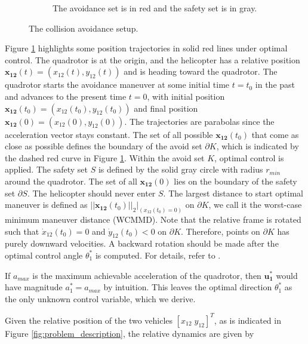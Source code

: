 \documentclass[journal,11pt,onecolumn,draftclsnofoot,]{IEEEtran}
\begin{document}
\begin{figure}
\begin{subfigure}[b]{.45\columnwidth}
        \caption{The avoidance set is in red and the safety set is in gray.}
        \label{fig:safety_set}
    \end{subfigure}
    \caption{The collision avoidance setup.}
    \label{fig:avoidance_setup}
\end{figure}


Figure \ref{fig:safety_set} highlights some position trajectories in solid red lines under optimal control. The quadrotor is at the origin, and the helicopter has a relative position $\boldsymbol{x_{12}}(t)=(x_{12}(t),y_{12}(t))$ and is heading toward the quadrotor. The quadrotor starts the avoidance maneuver at some initial time $t=t_0$ in the past and advances to the present time $t=0$, with initial position $\boldsymbol{x_{12}}(t_0)=(x_{12}(t_0),y_{12}(t_0))$ and final position $\boldsymbol{x_{12}}(0)=(x_{12}(0),y_{12}(0))$. The trajectories are parabolas since the acceleration vector stays constant. The set of all possible $\boldsymbol{x_{12}}(t_0)$ that come as close as possible defines the boundary of the avoid set $\partial K$, which is indicated by the dashed red curve in Figure \ref{fig:safety_set}. Within the avoid set $K$, optimal control is applied. The safety set $S$ is defined by the solid gray circle with radius $r_{min}$ around the quadrotor. The set of all $\boldsymbol{x_{12}}(0)$ lies on the boundary of the safety set $\partial S$. The helicopter should never enter $S$. The largest distance to start optimal maneuver is defined as $||\boldsymbol{x_{12}}(t_0)||_2 |_{(x_{12}(t_0)=0)}$ on $\partial K$, we call it the worst-case minimum maneuver distance (WCMMD). Note that the relative frame is rotated such that $\dot{x}_{12} (t_0)=0$ and $\dot{y}_{12}(t_0)<0$ on $\partial K$. Therefore, points on $\partial K$ has purely downward velocities. A backward rotation should be made after the optimal control angle $\theta_1^*$ is computed. For details, refer to \cite{hoffmann2008decentralized}.

If $a_{max}$ is the maximum achievable acceleration of the quadrotor, then $\boldsymbol{u_1^*}$ would have magnitude $a_1^*=a_{max}$ by intuition. This leaves the optimal direction $\theta_1^*$ as the only unknown control variable, which we derive.

Given the relative position of the two vehicles $\left[x_{12} \; y_{12}\right]^T$, as is indicated in Figure \ref{fig:problem_description}, the relative dynamics are given by 
\end{document}
